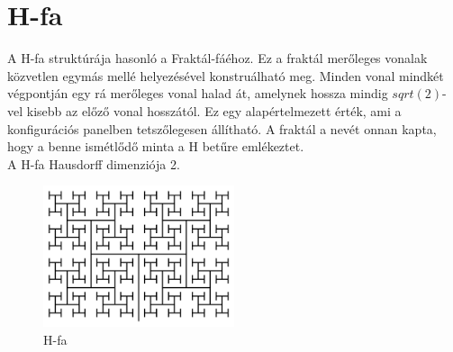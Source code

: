 \section{H-fa}
A H-fa struktúrája hasonló a Fraktál-fáéhoz. Ez a fraktál merőleges vonalak közvetlen egymás mellé helyezésével konstruálható meg. Minden vonal mindkét végpontján egy rá merőleges vonal halad át, amelynek hossza mindig $sqrt(2)$-vel kisebb az előző vonal hosszától. Ez egy alapértelmezett érték, ami a konfigurációs panelben tetszőlegesen állítható. A fraktál a nevét onnan kapta, hogy a benne ismétlődő minta a H betűre emlékeztet.\\ 
A H-fa Hausdorff dimenziója 2.
\begin{figure}[!ht]
	\begin{center}
		\includegraphics[width=0.5\textwidth]{img/HTree}
		\caption[labelInTOC]{H-fa}
	\end{center}
\end{figure}
